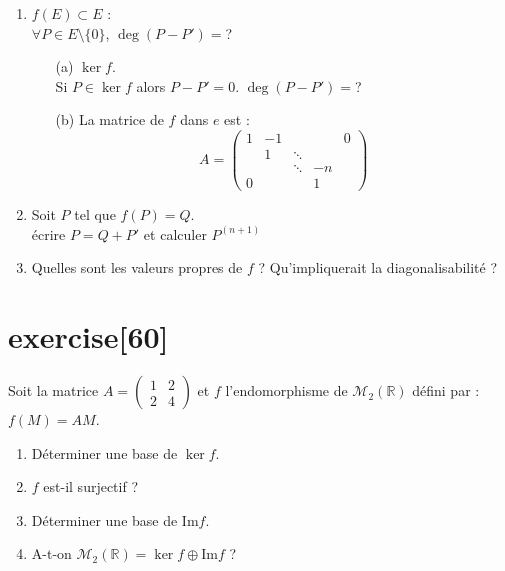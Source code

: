 \documentclass[a4paper,12pt,oneside]{book}
\newenvironment{statement}{\begin{statementbox}}{\end{statementbox}}
\newenvironment{solution}{\begin{solutionbox}}{\end{solutionbox}}
\begin{document}
\begin{solution}
	\begin{enumerate}
		\item $f(E) \subset E$ :\\
		$\forall P \in E \setminus \{0\}$, $\deg(P - P') = $?\\
		\begin{itemize}
			\item[(a)] $\ker f$.\\
			Si $P \in \ker f$ alors $P - P' = 0$. $\deg(P - P') = $? 
			\item[(b)] La matrice de $f$ dans $e$ est :
			\[
			A = \begin{pmatrix}
				1 & -1 &        &        & 0 \\
				& 1  & \ddots &        &   \\
				&    & \ddots & -n     &   \\
				0  &   &        & 1
			\end{pmatrix}
			\]
		\end{itemize}
		
		\item Soit $P$ tel que $f(P) = Q$. \\
		écrire $P = Q + P'$ et calculer $P^{(n+1)}$
		
		\item Quelles sont les valeurs propres de $f$ ? Qu'impliquerait la diagonalisabilité ?
	\end{enumerate}
\end{solution}


\section{exercise[60]}
	\begin{statement}
		Soit la matrice $A = \begin{pmatrix} 1 & 2 \\ 2 & 4 \end{pmatrix}$ et $f$ l’endomorphisme de $\mathcal{M}_2(\mathbb{R})$ défini par : $f(M) = AM$.
		\begin{enumerate}
			\item Déterminer une base de $\ker f$.
			\item $f$ est-il surjectif ?
			\item Déterminer une base de $\mathrm{Im} f$.
			\item A-t-on $\mathcal{M}_2(\mathbb{R}) = \ker f \oplus \mathrm{Im} f$ ?
		\end{enumerate}
	\end{statement}
	
\end{document}
